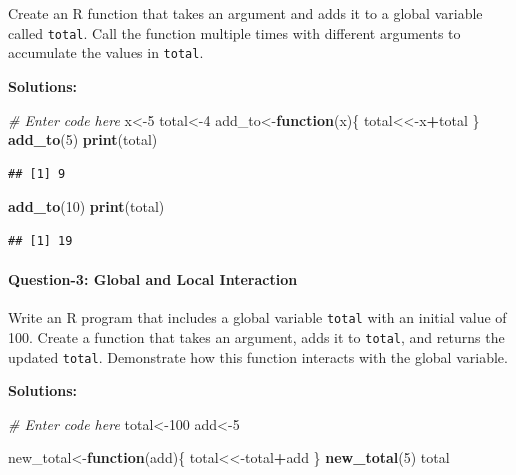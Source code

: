 \documentclass[
]{article}
\newenvironment{Shaded}{\begin{snugshade}}{\end{snugshade}}
\newcommand{\CommentTok}[1]{\textcolor[rgb]{0.56,0.35,0.01}{\textit{#1}}}
\newcommand{\ControlFlowTok}[1]{\textcolor[rgb]{0.13,0.29,0.53}{\textbf{#1}}}
\newcommand{\DecValTok}[1]{\textcolor[rgb]{0.00,0.00,0.81}{#1}}
\newcommand{\FunctionTok}[1]{\textcolor[rgb]{0.13,0.29,0.53}{\textbf{#1}}}
\newcommand{\NormalTok}[1]{#1}
\newcommand{\OtherTok}[1]{\textcolor[rgb]{0.56,0.35,0.01}{#1}}
\newcommand{\SpecialCharTok}[1]{\textcolor[rgb]{0.81,0.36,0.00}{\textbf{#1}}}
\begin{document}
Create an R function that takes an argument and adds it to a global
variable called \texttt{total}. Call the function multiple times with
different arguments to accumulate the values in \texttt{total}.

\textbf{Solutions:}

\begin{Shaded}
\begin{Highlighting}[]
\CommentTok{\# Enter code here}
\NormalTok{x}\OtherTok{\textless{}{-}}\DecValTok{5}
\NormalTok{total}\OtherTok{\textless{}{-}}\DecValTok{4}
\NormalTok{add\_to}\OtherTok{\textless{}{-}}\ControlFlowTok{function}\NormalTok{(x)\{}
\NormalTok{  total}\OtherTok{\textless{}\textless{}{-}}\NormalTok{x}\SpecialCharTok{+}\NormalTok{total}
\NormalTok{\}}
\FunctionTok{add\_to}\NormalTok{(}\DecValTok{5}\NormalTok{)}
\FunctionTok{print}\NormalTok{(total)}
\end{Highlighting}
\end{Shaded}

\begin{verbatim}
## [1] 9
\end{verbatim}

\begin{Shaded}
\begin{Highlighting}[]
\FunctionTok{add\_to}\NormalTok{(}\DecValTok{10}\NormalTok{)}
\FunctionTok{print}\NormalTok{(total)}
\end{Highlighting}
\end{Shaded}

\begin{verbatim}
## [1] 19
\end{verbatim}

\hypertarget{question-3-global-and-local-interaction}{%
\paragraph{Question-3: Global and Local
Interaction}\label{question-3-global-and-local-interaction}}

Write an R program that includes a global variable \texttt{total} with
an initial value of 100. Create a function that takes an argument, adds
it to \texttt{total}, and returns the updated \texttt{total}.
Demonstrate how this function interacts with the global variable.

\textbf{Solutions:}

\begin{Shaded}
\begin{Highlighting}[]
\CommentTok{\# Enter code here}
\NormalTok{total}\OtherTok{\textless{}{-}}\DecValTok{100}
\NormalTok{add}\OtherTok{\textless{}{-}}\DecValTok{5}

\NormalTok{new\_total}\OtherTok{\textless{}{-}}\ControlFlowTok{function}\NormalTok{(add)\{}
\NormalTok{  total}\OtherTok{\textless{}\textless{}{-}}\NormalTok{total}\SpecialCharTok{+}\NormalTok{add}
\NormalTok{\}}
\FunctionTok{new\_total}\NormalTok{(}\DecValTok{5}\NormalTok{)}
\NormalTok{total}
\end{Highlighting}
\end{Shaded}
\end{document}
